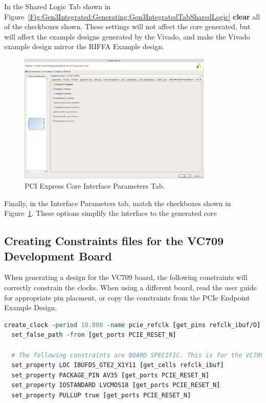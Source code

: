 \documentclass{refrep}
\newcommand{\Xilinx}[1]{{\color{red}{#1}}}
\newcommand{\ConfigSetting}[1]{\textbf{#1}}
\begin{document}
In the Shared Logic Tab shown in
Figure~\ref{Fig:Gen3Integrated:Generating:Gen3IntegratedTabSharedLogic}
\ConfigSetting{clear} all of the checkboxes shown. These settings will not
affect the core generated, but will affect the example designs generated by the
Vivado, and make the Vivado example design mirror the RIFFA Example design.
\begin{figure}[H]
  \includegraphics[width=350px,center]{Gen3IntegratedTabCoreInterfaceParameters.png}
  \caption{PCI Express Core Interface Parameters Tab.}
  \label{Fig:Gen3Integrated:Generating:Gen3IntegratedTabCoreInterfaceParameters}
\end{figure}
Finally, in the Interface Parameters tab, match the checkboxes shown in
Figure~\ref{Fig:Gen3Integrated:Generating:Gen3IntegratedTabCoreInterfaceParameters}. These
options simplify the interface to the generated core
\subsection{Creating Constraints files for the VC709 Development Board}
\label{Sec:Gen3Integrated:Generating:Constraints}
When generating a design for the VC709 board, the following constraints will
correctly constrain the clocks. When using a different board, read the user
guide for appropriate pin placment, or copy the constraints from the PCIe
Endpoint Example Design.
\begin{lstlisting}[basicstyle=\footnotesize\ttfamily,language=tcl,
    commentstyle=\color{red},label=Listing:7SeriesIntegrated:Generating:Constraints:VC709,
    caption=\Xilinx{.xdc} constraints for the VC709 board,frame=single]
  create_clock -period 10.000 -name pcie_refclk [get_pins refclk_ibuf/O]
  set_false_path -from [get_ports PCIE_RESET_N]

  # The following constraints are BOARD SPECIFIC. This is for the VC709
  set_property LOC IBUFDS_GTE2_X1Y11 [get_cells refclk_ibuf]
  set_property PACKAGE_PIN AV35 [get_ports PCIE_RESET_N]
  set_property IOSTANDARD LVCMOS18 [get_ports PCIE_RESET_N]
  set_property PULLUP true [get_ports PCIE_RESET_N]
\end{lstlisting}
\end{document}
